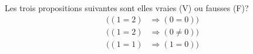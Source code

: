 Les trois propositions suivantes sont elles vraies (V) ou fausses (F)?
\begin{align*}
  ( (1 = 2) &\Rightarrow (0 = 0) )  \\
  ( (1 = 2) &\Rightarrow (0 \neq 0) ) \\
  ( (1 = 1) &\Rightarrow (1 = 0) )
\end{align*}
